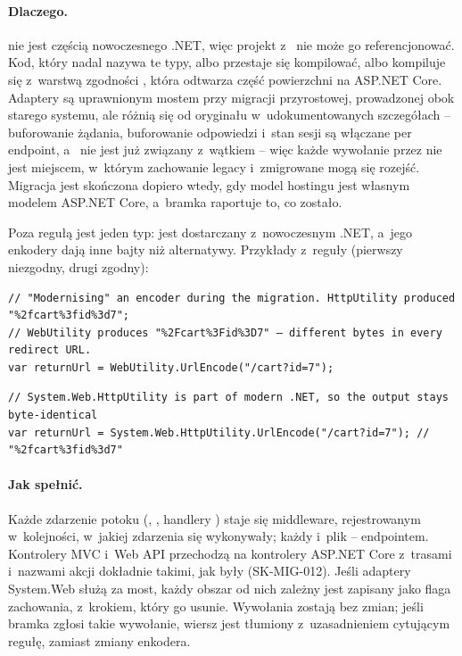 \paragraph{Dlaczego.}  nie jest częścią nowoczesnego .NET, więc
projekt z~ nie może go referencjonować. Kod, który nadal nazywa te typy,
albo przestaje się kompilować, albo kompiluje się z~warstwą zgodności
, która odtwarza część powierzchni
 na ASP.NET Core. Adaptery są uprawnionym mostem przy migracji
przyrostowej, prowadzonej obok starego systemu, ale różnią się od oryginału w~udokumentowanych
szczegółach -- buforowanie żądania, buforowanie odpowiedzi i~stan sesji są włączane per
endpoint, a~ nie jest już związany z~wątkiem -- więc każde
wywołanie przez nie jest miejscem, w~którym zachowanie legacy i~zmigrowane mogą się rozejść.
Migracja jest skończona dopiero wtedy, gdy model hostingu jest własnym modelem ASP.NET Core,
a~bramka raportuje to, co zostało.

Poza regułą jest jeden typ:  jest dostarczany
z~nowoczesnym .NET, a~jego enkodery dają inne bajty niż alternatywy. Przykłady z~reguły
(pierwszy niezgodny, drugi zgodny):

\begin{lstlisting}
// "Modernising" an encoder during the migration. HttpUtility produced "%2fcart%3fid%3d7";
// WebUtility produces "%2Fcart%3Fid%3D7" — different bytes in every redirect URL.
var returnUrl = WebUtility.UrlEncode("/cart?id=7");
\end{lstlisting}

\begin{lstlisting}
// System.Web.HttpUtility is part of modern .NET, so the output stays byte-identical
var returnUrl = System.Web.HttpUtility.UrlEncode("/cart?id=7"); // "%2fcart%3fid%3d7"
\end{lstlisting}

\paragraph{Jak spełnić.} Każde zdarzenie potoku (,
, handlery ) staje się middleware,
rejestrowanym w~kolejności, w~jakiej zdarzenia się wykonywały; każdy 
i~plik  -- endpointem. Kontrolery MVC i~Web API przechodzą na kontrolery
ASP.NET Core z~trasami i~nazwami akcji dokładnie takimi, jak były (SK-MIG-012). Jeśli
adaptery System.Web służą za most, każdy obszar od nich zależny jest zapisany jako flaga
zachowania, z~krokiem, który go usunie. Wywołania  zostają bez zmian;
jeśli bramka zgłosi takie wywołanie, wiersz jest tłumiony z~uzasadnieniem cytującym regułę,
zamiast zmiany enkodera.

